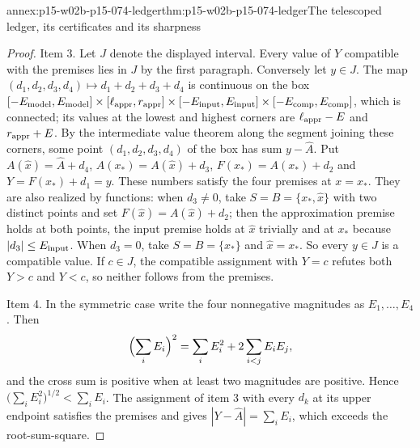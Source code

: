 \begin{annexitem}{annex:p15-w02b-p15-074-ledger}{thm:p15-w02b-p15-074-ledger}{The telescoped ledger, its certificates and its sharpness}
\begin{proof}
Item 3. Let \(J\) denote the displayed interval. Every value of \(Y\)
compatible with the premises lies in \(J\) by the first paragraph.
Conversely let \(y\in J\). The map
\((d_1,d_2,d_3,d_4)\mapsto d_1+d_2+d_3+d_4\) is continuous on the box
\([-E_{\rm model},E_{\rm model}]\times[\ell_{\rm appr},r_{\rm appr}]
\times[-E_{\rm input},E_{\rm input}]\times[-E_{\rm comp},E_{\rm comp}]\),
which is connected; its values at the lowest and highest corners are
\(\ell_{\rm appr}-E\) and \(r_{\rm appr}+E\). By the intermediate value
theorem along the segment joining these corners, some point
\((d_1,d_2,d_3,d_4)\) of the box has sum \(y-\widehat A\). Put
\(A(\widehat x)=\widehat A+d_4\), \(A(x_*)=A(\widehat x)+d_3\),
\(F(x_*)=A(x_*)+d_2\) and \(Y=F(x_*)+d_1=y\). These numbers satisfy the
four premises at \(x=x_*\). They are also realized by functions: when
\(d_3\neq0\), take \(S=B=\{x_*,\widehat x\}\) with two distinct points
and set \(F(\widehat x)=A(\widehat x)+d_2\); then the approximation premise
holds at both points, the input premise holds at \(\widehat x\) trivially
and at \(x_*\) because \(|d_3|\leq E_{\rm input}\). When \(d_3=0\), take
\(S=B=\{x_*\}\) and \(\widehat x=x_*\). So every \(y\in J\) is a
compatible value. If \(c\in J\), the compatible assignment with \(Y=c\)
refutes both \(Y>c\) and \(Y<c\), so neither follows from the premises.

Item 4. In the symmetric case write the four nonnegative magnitudes as
\(E_1,\ldots,E_4\). Then
\[
 \Bigl(\sum_iE_i\Bigr)^2=\sum_iE_i^2+2\sum_{i<j}E_iE_j,
\]
and the cross sum is positive when at least two magnitudes are positive.
Hence \(\bigl(\sum_iE_i^2\bigr)^{1/2}<\sum_iE_i\). The assignment of
item 3 with every \(d_k\) at its upper endpoint satisfies the premises and
gives \(|Y-\widehat A|=\sum_iE_i\), which exceeds the root-sum-square.
\end{proof}
\end{annexitem}


